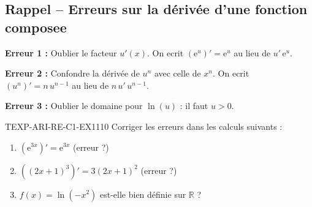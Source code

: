 

\subsection*{Rappel -- Erreurs sur la dérivée d'une fonction composee}

\textbf{Erreur 1 :} Oublier le facteur $u'(x)$. On ecrit $(\mathrm{e}^{u})' = \mathrm{e}^u$ au lieu de $u'\,\mathrm{e}^u$.

\textbf{Erreur 2 :} Confondre la dérivée de $u^n$ avec celle de $x^n$. On ecrit $(u^n)' = n\,u^{n-1}$ au lieu de $n\,u'\,u^{n-1}$.

\textbf{Erreur 3 :} Oublier le domaine pour $\ln(u)$ : il faut $u > 0$.

\begin{exercice}{TEXP-ARI-RE-C1-EX1}{1}{10}
Corriger les erreurs dans les calculs suivants :
\begin{enumerate}
  \item $\left(\mathrm{e}^{3x}\right)' = \mathrm{e}^{3x}$ \quad (erreur ?)
  \item $\left((2x+1)^3\right)' = 3(2x+1)^2$ \quad (erreur ?)
  \item $f(x) = \ln(-x^2)$ est-elle bien définie sur $\mathbb{R}$ ?
\end{enumerate}
\end{exercice}

